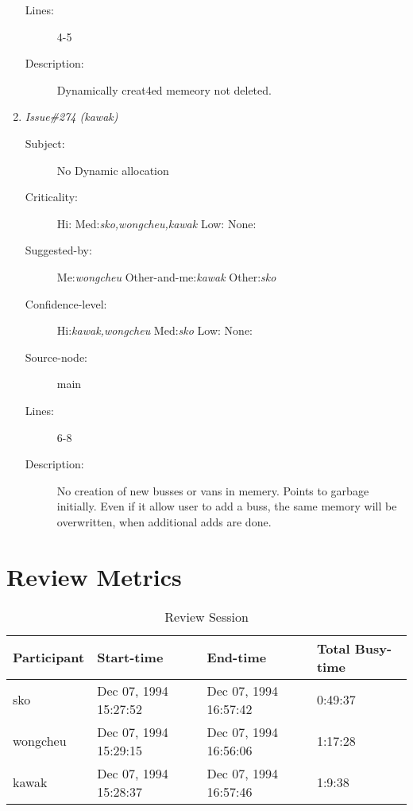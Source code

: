 \begin{enumerate}
\begin{description}
\item [Lines:] 4-5

\item [Description:] Dynamically creat4ed memeory not deleted.
\end{description}
\item {\it Issue\#274 (kawak)}
\begin{description}
\item [Subject:] No Dynamic allocation
\item [Criticality:] Hi:{\it } Med:{\it sko,wongcheu,kawak} Low:{\it } None:{\it }
\item [Suggested-by:] Me:{\it wongcheu} Other-and-me:{\it kawak} Other:{\it sko}
\item [Confidence-level:] Hi:{\it kawak,wongcheu} Med:{\it sko} Low:{\it } None:{\it }
\item [Source-node:] main

\item [Lines:] 6-8

\item [Description:] No creation of new busses or vans in memery.  Points to garbage initially.
Even if it allow user to add a buss, the same memory will be overwritten,
when additional adds are done.
\end{description}
\end{enumerate}
\section{Review Metrics}
\begin{table}[hb]
\begin{center}
\begin{tabular}{|l|l|l|l|}
\hline
Participant & Start-time & End-time & Total Busy-time \\
\hline
sko & Dec 07, 1994 15:27:52 & Dec 07, 1994 16:57:42 & 0:49:37 \\
wongcheu & Dec 07, 1994 15:29:15 & Dec 07, 1994 16:56:06 & 1:17:28 \\
kawak & Dec 07, 1994 15:28:37 & Dec 07, 1994 16:57:46 & 1:9:38 \\
\hline
\end{tabular}
\end{center}
\caption{Review Session}
\end{table}


